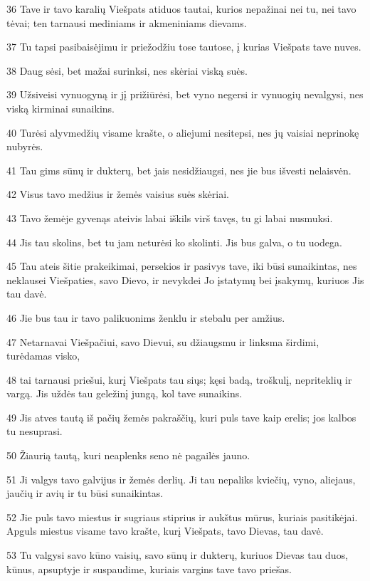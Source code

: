 \par 36 Tave ir tavo karalių Viešpats atiduos tautai, kurios nepažinai nei tu, nei tavo tėvai; ten tarnausi mediniams ir akmeniniams dievams. 
\par 37 Tu tapsi pasibaisėjimu ir priežodžiu tose tautose, į kurias Viešpats tave nuves. 
\par 38 Daug sėsi, bet mažai surinksi, nes skėriai viską suės. 
\par 39 Užsiveisi vynuogyną ir jį prižiūrėsi, bet vyno negersi ir vynuogių nevalgysi, nes viską kirminai sunaikins. 
\par 40 Turėsi alyvmedžių visame krašte, o aliejumi nesitepsi, nes jų vaisiai neprinokę nubyrės. 
\par 41 Tau gims sūnų ir dukterų, bet jais nesidžiaugsi, nes jie bus išvesti nelaisvėn. 
\par 42 Visus tavo medžius ir žemės vaisius suės skėriai. 
\par 43 Tavo žemėje gyvenąs ateivis labai iškils virš tavęs, tu gi labai nusmuksi. 
\par 44 Jis tau skolins, bet tu jam neturėsi ko skolinti. Jis bus galva, o tu uodega. 
\par 45 Tau ateis šitie prakeikimai, persekios ir pasivys tave, iki būsi sunaikintas, nes neklausei Viešpaties, savo Dievo, ir nevykdei Jo įstatymų bei įsakymų, kuriuos Jis tau davė. 
\par 46 Jie bus tau ir tavo palikuonims ženklu ir stebalu per amžius. 
\par 47 Netarnavai Viešpačiui, savo Dievui, su džiaugsmu ir linksma širdimi, turėdamas visko, 
\par 48 tai tarnausi priešui, kurį Viešpats tau siųs; kęsi badą, troškulį, nepriteklių ir vargą. Jis uždės tau geležinį jungą, kol tave sunaikins. 
\par 49 Jis atves tautą iš pačių žemės pakraščių, kuri puls tave kaip erelis; jos kalbos tu nesuprasi. 
\par 50 Žiaurią tautą, kuri neaplenks seno nė pagailės jauno. 
\par 51 Ji valgys tavo galvijus ir žemės derlių. Ji tau nepaliks kviečių, vyno, aliejaus, jaučių ir avių ir tu būsi sunaikintas. 
\par 52 Jie puls tavo miestus ir sugriaus stiprius ir aukštus mūrus, kuriais pasitikėjai. Apguls miestus visame tavo krašte, kurį Viešpats, tavo Dievas, tau davė. 
\par 53 Tu valgysi savo kūno vaisių, savo sūnų ir dukterų, kuriuos Dievas tau duos, kūnus, apsuptyje ir suspaudime, kuriais vargins tave tavo priešas. 
